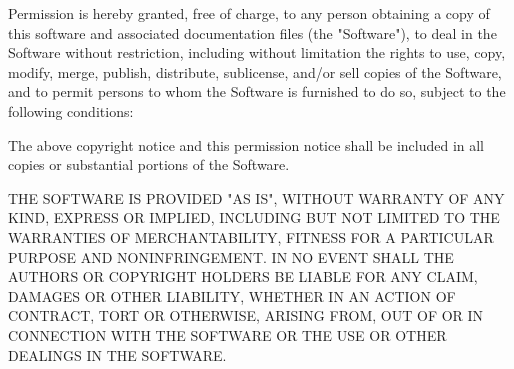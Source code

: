 \documentclass{article}
\begin{document}
\vspace{5pt}

Permission is hereby granted, free of charge, to any person obtaining
a copy of this software and associated documentation files (the
"Software"), to deal in the Software without restriction, including
without limitation the rights to use, copy, modify, merge, publish,
distribute, sublicense, and/or sell copies of the Software, and to
permit persons to whom the Software is furnished to do so, subject to
the following conditions:

\vspace{5pt}

The above copyright notice and this permission notice shall be
included in all copies or substantial portions of the Software.

\vspace{5pt}

THE SOFTWARE IS PROVIDED "AS IS", WITHOUT WARRANTY OF ANY KIND,
EXPRESS OR IMPLIED, INCLUDING BUT NOT LIMITED TO THE WARRANTIES OF
MERCHANTABILITY, FITNESS FOR A PARTICULAR PURPOSE AND
NONINFRINGEMENT. IN NO EVENT SHALL THE AUTHORS OR COPYRIGHT HOLDERS BE
LIABLE FOR ANY CLAIM, DAMAGES OR OTHER LIABILITY, WHETHER IN AN ACTION
OF CONTRACT, TORT OR OTHERWISE, ARISING FROM, OUT OF OR IN CONNECTION
WITH THE SOFTWARE OR THE USE OR OTHER DEALINGS IN THE SOFTWARE.
\end{document}
